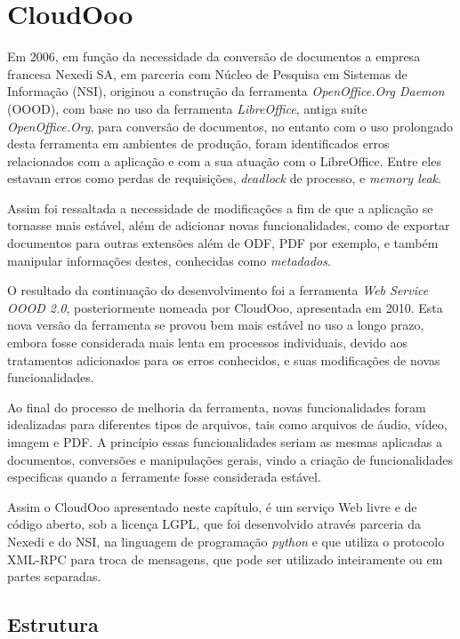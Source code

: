 \chapter{CloudOoo}
\thispagestyle{empty}

Em 2006, em função da necessidade da conversão de documentos a empresa francesa Nexedi SA, em parceria com Núcleo de Pesquisa em Sistemas de Informação (NSI), originou a construção da ferramenta \textit{OpenOffice.Org Daemon} (OOOD), com base no uso da ferramenta \textit{LibreOffice}, antiga suíte \textit{OpenOffice.Org}, para conversão de documentos, no entanto com o uso prolongado desta ferramenta em ambientes de produção, foram identificados erros relacionados com a aplicação e com a sua atuação com o LibreOffice. Entre eles estavam erros como perdas de requisições, \textit{deadlock} de processo, e \textit{memory leak}.

Assim foi ressaltada a necessidade de modificações a fim de que a aplicação se tornasse mais estável, além de adicionar novas funcionalidades, como de exportar documentos para outras extensões além de ODF, PDF por exemplo, e também manipular informações destes, conhecidas como \textit{metadados}.

O resultado da continuação do desenvolvimento foi a ferramenta \textit{Web Service OOOD 2.0}, posteriormente nomeada por CloudOoo, apresentada em 2010. Esta nova versão da ferramenta se provou bem mais estável no uso a longo prazo, embora fosse considerada mais lenta em processos individuais, devido aos tratamentos adicionados para os erros conhecidos, e suas modificações de novas funcionalidades.

Ao final do processo de melhoria da ferramenta, novas funcionalidades foram idealizadas para diferentes tipos de arquivos, tais como arquivos de áudio, vídeo, imagem e PDF. A princípio essas funcionalidades seriam as mesmas aplicadas a documentos, conversões e manipulações gerais, vindo a criação de funcionalidades especificas quando a ferramente fosse considerada estável.

Assim o CloudOoo apresentado neste capítulo, é um serviço Web livre e de código aberto, sob a licença LGPL, que foi desenvolvido através parceria da Nexedi e do NSI, na linguagem de programação \textit{python} e que utiliza o protocolo XML-RPC para troca de mensagens, que pode ser utilizado inteiramente ou em partes separadas.

\section{Estrutura}

